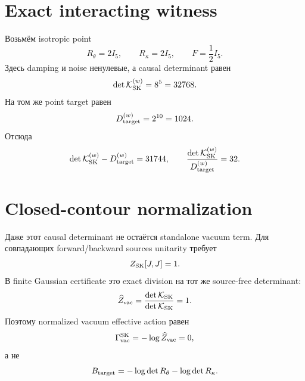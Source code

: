 \section{Exact interacting witness}

Возьмём isotropic point
\begin{equation}
 R_\theta=2I_5,
 \qquad R_\kappa=2I_5,
 \qquad F=\frac12 I_5.
 \label{eq:v9-kms-keldysh-witness}
\end{equation}
Здесь damping и noise ненулевые, а causal determinant равен
\begin{equation}
 \det\mathcal K_{\rm SK}^{(w)}=8^5=32768.
 \label{eq:v9-kms-keldysh-witness-determinant}
\end{equation}
На том же point target равен
\begin{equation}
 D_{\rm target}^{(w)}=2^{10}=1024.
 \label{eq:v9-kms-keldysh-witness-target}
\end{equation}
Отсюда
\begin{equation}
 \det\mathcal K_{\rm SK}^{(w)}-D_{\rm target}^{(w)}=31744,
 \qquad
 \frac{\det\mathcal K_{\rm SK}^{(w)}}{D_{\rm target}^{(w)}}=32.
 \label{eq:v9-kms-keldysh-witness-defect}
\end{equation}

\section{Closed-contour normalization}

Даже этот causal determinant не остаётся standalone vacuum term. Для
совпадающих forward/backward sources unitarity требует
\begin{equation}
 Z_{\rm SK}[J,J]=1.
 \label{eq:v9-kms-keldysh-normalization}
\end{equation}
В finite Gaussian certificate это exact division на тот же source-free
determinant:
\begin{equation}
 \widehat Z_{\rm vac}=
 \frac{\det\mathcal K_{\rm SK}}{\det\mathcal K_{\rm SK}}=1.
 \label{eq:v9-kms-keldysh-normalized-ratio}
\end{equation}
Поэтому normalized vacuum effective action равен
\begin{equation}
 \Gamma_{\rm vac}^{\rm SK}=-\log\widehat Z_{\rm vac}=0,
 \label{eq:v9-kms-keldysh-normalized-action}
\end{equation}
а не
\begin{equation}
 B_{\rm target}=-\log\det R_\theta-\log\det R_\kappa.
 \label{eq:v9-kms-keldysh-target-barrier}
\end{equation}

